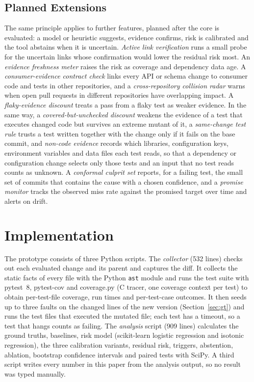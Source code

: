 \documentclass[conference]{IEEEtran}
\begin{document}
\subsection{Planned Extensions}
The same principle applies to further features, planned after the core is evaluated: a model or heuristic suggests, evidence confirms, risk is calibrated and the tool abstains when it is uncertain. \emph{Active link verification} runs a small probe for the uncertain links whose confirmation would lower the residual risk most. An \emph{evidence freshness meter} raises the risk as coverage and dependency data age. A \emph{consumer-evidence contract check} links every API or schema change to consumer code and tests in other repositories, and a \emph{cross-repository collision radar} warns when open pull requests in different repositories have overlapping impact. A \emph{flaky-evidence discount} treats a pass from a flaky test as weaker evidence. In the same way, a \emph{covered-but-unchecked discount} weakens the evidence of a test that executes changed code but survives an extreme mutant of it, a \emph{same-change test rule} trusts a test written together with the change only if it fails on the base commit, and \emph{non-code evidence} records which libraries, configuration keys, environment variables and data files each test reads, so that a dependency or configuration change selects only those tests and an input that no test reads counts as unknown. A \emph{conformal culprit set} reports, for a failing test, the small set of commits that contains the cause with a chosen confidence, and a \emph{promise monitor} tracks the observed miss rate against the promised target over time and alerts on drift.

\section{Implementation}\label{sec:impl}
The prototype consists of three Python scripts. The \emph{collector} (532 lines) checks out each evaluated change and its parent and captures the diff. It collects the static facts of every file with the Python \texttt{ast} module and runs the test suite with pytest~8, pytest-cov and coverage.py (C tracer, one coverage context per test) to obtain per-test-file coverage, run times and per-test-case outcomes. It then seeds up to three faults on the changed lines of the new version (Section~\ref{sec:gt}) and runs the test files that executed the mutated file; each test has a timeout, so a test that hangs counts as failing. The \emph{analysis} script (909 lines) calculates the ground truths, baselines, risk model (scikit-learn logistic regression and isotonic regression), the three calibration variants, residual risk, triggers, abstention, ablation, bootstrap confidence intervals and paired tests with SciPy. A third script writes every number in this paper from the analysis output, so no result was typed manually.
\end{document}
